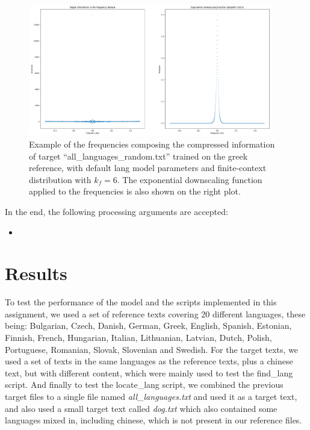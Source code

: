 \documentclass{article}
\begin{document}
\begin{figure}
    \centering
    \includegraphics[width=0.95\textwidth]{./images/low_pass_filter.png}
    \caption{Example of the frequencies composing the compressed information of target ``all_languages_random.txt'' trained on the greek reference, with default lang model parameters and finite-context distribution with $k_f=6$. The exponential downscaling function applied to the frequencies is also shown on the right plot.}
    \label{fig:low_pass_filter}
\end{figure}


In the end, the following processing arguments are accepted:
\begin{itemize}
    \item 
\end{itemize}

\section{Results}
\label{sec:results}


To test the performance of the model and the scripts implemented in this assignment, we used a set of reference texts covering 20 different languages,
these being: Bulgarian, Czech, Danish, German, Greek, English, Spanish, Estonian, Finnish, French, Hungarian, Italian, Lithuanian, Latvian, Dutch, Polish, Portuguese, Romanian, Slovak, Slovenian and Swedish.
For the target texts, we used a set of texts in the same languages as the reference texts, plus a chinese text, but with different content, which were mainly used to test the find_lang script.
And finally to test the locate_lang script, we combined the previous target files to a single file named \textit{all_languages.txt} and used it as a target text, and also used a small target text called \textit{dog.txt}
which also contained some languages mixed in, including chinese, which is not present in our reference files.
\end{document}
